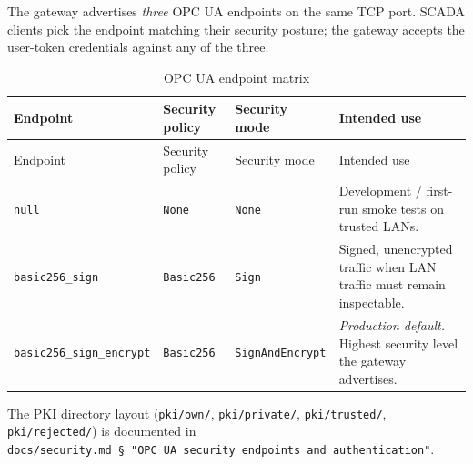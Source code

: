 The gateway advertises \emph{three} OPC UA endpoints on the same TCP port. SCADA clients pick the endpoint matching their security posture; the gateway accepts the user-token credentials against any of the three.

\begin{longtable}[]{@{}llll@{}}
\caption{OPC UA endpoint matrix}\tabularnewline
\toprule\noalign{}
Endpoint & Security policy & Security mode & Intended use \\
\midrule\noalign{}
\endfirsthead
\toprule\noalign{}
Endpoint & Security policy & Security mode & Intended use \\
\midrule\noalign{}
\endhead
\bottomrule\noalign{}
\endlastfoot
\texttt{null} & \texttt{None} & \texttt{None} & Development / first-run smoke tests on trusted LANs. \\
\texttt{basic256\_sign} & \texttt{Basic256} & \texttt{Sign} & Signed, unencrypted traffic when LAN traffic must remain inspectable. \\
\texttt{basic256\_sign\_encrypt} & \texttt{Basic256} & \texttt{SignAndEncrypt} & \emph{Production default.} Highest security level the gateway advertises. \\
\end{longtable}

The PKI directory layout (\texttt{pki/own/}, \texttt{pki/private/}, \texttt{pki/trusted/}, \texttt{pki/rejected/}) is documented in \texttt{docs/security.md\ §\ "OPC\ UA\ security\ endpoints\ and\ authentication"}.

